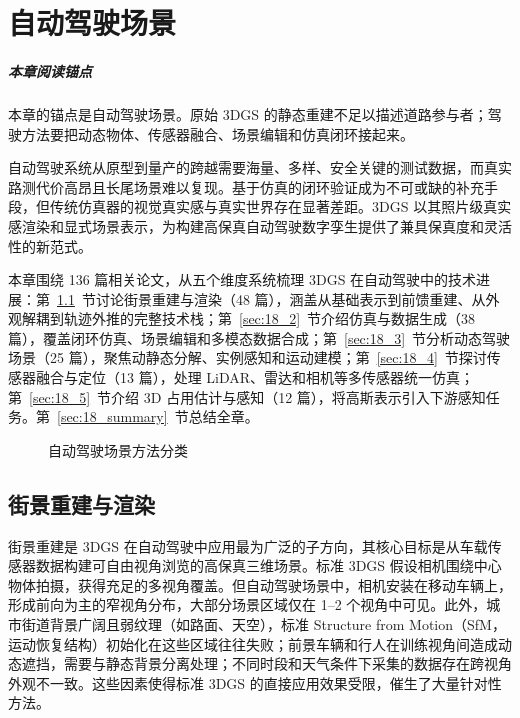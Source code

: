 \chapter{自动驾驶场景}
\label{ch:18}

\paragraph*{本章阅读锚点}
本章的锚点是自动驾驶场景。原始 3DGS 的静态重建不足以描述道路参与者；驾驶方法要把动态物体、传感器融合、场景编辑和仿真闭环接起来。


自动驾驶系统从原型到量产的跨越需要海量、多样、安全关键的测试数据，而真实路测代价高昂且长尾场景难以复现。基于仿真的闭环验证成为不可或缺的补充手段，但传统仿真器的视觉真实感与真实世界存在显著差距。3DGS 以其照片级真实感渲染和显式场景表示，为构建高保真自动驾驶数字孪生提供了兼具保真度和灵活性的新范式。

本章围绕 136 篇相关论文，从五个维度系统梳理 3DGS 在自动驾驶中的技术进展：第~\ref{sec:18_1}~节讨论街景重建与渲染（48 篇），涵盖从基础表示到前馈重建、从外观解耦到轨迹外推的完整技术栈；第~\ref{sec:18_2}~节介绍仿真与数据生成（38 篇），覆盖闭环仿真、场景编辑和多模态数据合成；第~\ref{sec:18_3}~节分析动态驾驶场景（25 篇），聚焦动静态分解、实例感知和运动建模；第~\ref{sec:18_4}~节探讨传感器融合与定位（13 篇），处理 LiDAR、雷达和相机等多传感器统一仿真；第~\ref{sec:18_5}~节介绍 3D 占用估计与感知（12 篇），将高斯表示引入下游感知任务。第~\ref{sec:18_summary}~节总结全章。

\begin{figure}[htbp]
\centering
\resizebox{\textwidth}{!}{}
\caption{自动驾驶场景方法分类}
\label{fig:ch18_driving_taxonomy}
\end{figure}

\section{街景重建与渲染}
\label{sec:18_1}

街景重建是 3DGS 在自动驾驶中应用最为广泛的子方向，其核心目标是从车载传感器数据构建可自由视角浏览的高保真三维场景。标准 3DGS 假设相机围绕中心物体拍摄，获得充足的多视角覆盖。但自动驾驶场景中，相机安装在移动车辆上，形成前向为主的窄视角分布，大部分场景区域仅在 1--2 个视角中可见。此外，城市街道背景广阔且弱纹理（如路面、天空），标准 Structure from Motion（SfM，运动恢复结构）初始化在这些区域往往失败；前景车辆和行人在训练视角间造成动态遮挡，需要与静态背景分离处理；不同时段和天气条件下采集的数据存在跨视角外观不一致。这些因素使得标准 3DGS 的直接应用效果受限，催生了大量针对性方法。

